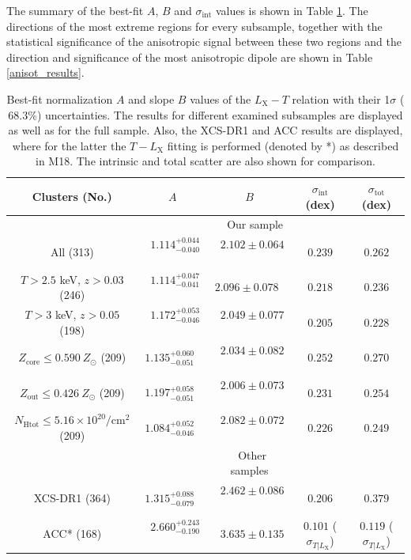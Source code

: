 \documentclass{aa}   %
\begin{document}
The summary of the best-fit $A$, $B$ and $\sigma_{\text{int}}$ values is shown in Table \ref{results}. The directions of the most extreme regions for every subsample, together with the statistical significance of the anisotropic signal between these two regions and the direction and significance of the most anisotropic dipole are shown in Table \ref{anisot_results}.


\begin{table}[hbtp]
\caption{\small{Best-fit normalization $A$ and slope $B$ values of the $L_{\text{X}}-T$ relation with their 1$\sigma$  ($68.3\%$) uncertainties. The results for different examined subsamples are displayed as well as for the full sample. Also, the XCS-DR1 and ACC results are displayed, where for the latter the $T-L_{\text{X}}$ fitting is performed (denoted by *) as described in M18. The intrinsic and total scatter are also shown for comparison.}}
\label{results}
\begin{center}
\renewcommand{\arraystretch}{1.3}
\small
\begin{tabular}{ c  c  c  c  c }
\hline \hline


Clusters (No.) & $A$ & $B$ & $\sigma_{\text{int}}$ (dex) & $\sigma_{\text{tot}}$ (dex) \\
\hline \hline

 & &\ \  Our sample & & \\ \hline

All (313) &\ $1.114^{+0.044}_{-0.040}$\ & \ $2.102\pm 0.064$ \ & $0.239$ & $0.262$ \\ \hline
$T>2.5$ keV, $z>0.03$ (246) &\  $1.114^{+0.047}_{-0.041}$\ & $2.096\pm 0.078$\ & $0.218$ & $0.236$ \\ 
$T>3$ keV, $z>0.05$ (198) &\ $1.172^{+0.053}_{-0.046}$\ & \ $2.049\pm 0.077$\ & $0.205$ & $0.228$ \\ 
$Z_{\text{core}}\leq 0.590\ Z_{\odot}$ (209) &$1.135^{+0.060}_{-0.051}$\ & \ $2.034\pm 0.082$\ & $0.252$ & $0.270$ \\ 
$Z_{\text{out}}\leq 0.426\ Z_{\odot}$ (209) &$1.197^{+0.058}_{-0.051}$\ & \ $2.006\pm 0.073$\ & $0.231$ & $0.254$ \\ 
$N_{\text{Htot}}\leq 5.16\times 10^{20}/$cm$^2$ (209) & $1.084^{+0.052}_{-0.046}$\ & \ $2.082\pm 0.072$\ & $0.226$ & $0.249$ \\ 

 \hline
 
   & &\ Other samples& &\\ \hline
XCS-DR1 (364) &$1.315^{+0.088}_{-0.079}$\ & \ $2.462\pm 0.086$\ & $0.206$ & $0.379$ \\
ACC* (168) &\ $2.660^{+0.243}_{-0.190}$\ & \ $3.635\pm 0.135$ & $0.101$ ($\sigma_{T|L_{\text{X}}}$) &  $0.119$ ($\sigma_{T|L_{\text{X}}}$) \\

\end{tabular}
\end{center}
\end{table}
\end{document}
